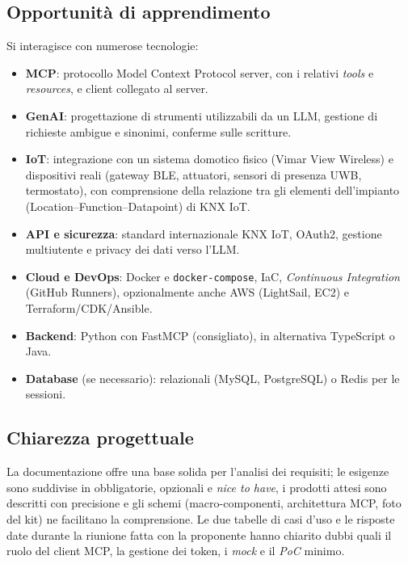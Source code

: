 \documentclass[11pt, a4paper]{article}
\begin{document}
\subsection{Opportunità di apprendimento}
Si interagisce con numerose tecnologie:
\begin{itemize}
    \item \textbf{MCP}: protocollo Model Context Protocol server, con i relativi \textit{tools} e \textit{resources}, e client collegato al server.
    \item \textbf{GenAI}: progettazione di strumenti utilizzabili da un LLM, gestione di richieste ambigue e sinonimi, conferme sulle scritture.
    \item \textbf{IoT}: integrazione con un sistema domotico fisico (Vimar View Wireless) e dispositivi reali (gateway BLE, attuatori, sensori di presenza UWB, termostato), con comprensione della relazione tra gli elementi dell'impianto (Location--Function--Datapoint) di KNX IoT.
    \item \textbf{API e sicurezza}: standard internazionale KNX IoT, OAuth2, gestione multiutente e privacy dei dati verso l'LLM.
    \item \textbf{Cloud e DevOps}: Docker e \texttt{docker-compose}, IaC, \textit{Continuous Integration} (GitHub Runners), opzionalmente anche AWS (LightSail, EC2) e Terraform/CDK/Ansible.
    \item \textbf{Backend}: Python con FastMCP (consigliato), in alternativa TypeScript o Java.
    \item \textbf{Database} (se necessario): relazionali (MySQL, PostgreSQL) o Redis per le sessioni.
\end{itemize}

\subsection{Chiarezza progettuale}
La documentazione offre una base solida per l'analisi dei requisiti; le esigenze sono suddivise in obbligatorie, opzionali e \textit{nice to have}, i prodotti attesi sono descritti con precisione e gli schemi (macro-componenti, architettura MCP, foto del kit) ne facilitano la comprensione. Le due tabelle di casi d'uso e le risposte date durante la riunione fatta con la proponente hanno chiarito dubbi quali il ruolo del client MCP, la gestione dei token, i \textit{mock} e il \textit{PoC} minimo.
\end{document}
